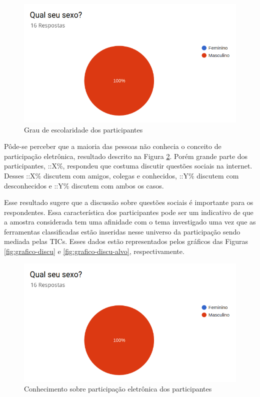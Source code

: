 \begin{figure}[!ht]
    \centering
    \includegraphics[scale=0.3]{./figuras/grafico_placeholder.png}
    \caption{Grau de escolaridade dos participantes}
    \label{fig:grafico-grau}
\end{figure}

\par
Pôde-se perceber que a maioria das pessoas não conhecia o conceito de participação eletrônica, resultado descrito na Figura \ref{fig:grafico-participacao}. Porém grande parte dos participantes,
::X\%, respondeu que costuma discutir questões sociais na internet. Desses ::X\% discutem com amigos, colegas e conhecidos, ::Y\% discutem com desconhecidos
e ::Y\% discutem com ambos os casos.

\par
Esse resultado sugere que a discussão sobre questões sociais é importante para os respondentes. Essa característica dos participantes pode ser um indicativo de que a amostra considerada tem uma afinidade com o tema investigado uma vez que as ferramentas classificadas estão inseridas nesse universo da participação sendo mediada pelas TICs.
Esses dados estão representados pelos gráficos das Figuras \ref{fig:grafico-discu} e  \ref{fig:grafico-discu-alvo}, respectivamente. 

\begin{figure}[!ht]
    \centering
    \includegraphics[scale=0.3]{./figuras/grafico_placeholder.png}
    \caption{Conhecimento sobre participação eletrônica dos participantes}
    \label{fig:grafico-participacao}
\end{figure}

